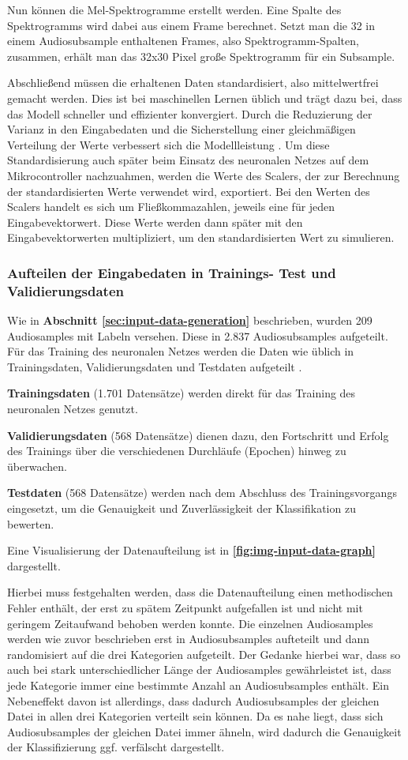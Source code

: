 Nun können die Mel-Spektrogramme erstellt werden. Eine Spalte des Spektrogramms wird dabei aus einem Frame berechnet. Setzt man die 32 in einem Audiosubsample enthaltenen Frames, also Spektrogramm-Spalten, zusammen, erhält man das 32x30 Pixel große Spektrogramm für ein Subsample.

Abschließend müssen die erhaltenen Daten standardisiert, also mittelwertfrei gemacht werden. Dies ist bei maschinellen Lernen üblich und trägt dazu bei, dass das Modell schneller und effizienter konvergiert. Durch die Reduzierung der Varianz in den Eingabedaten und die Sicherstellung einer gleichmäßigen Verteilung der Werte verbessert sich die Modellleistung \cite{ml-standardization-reason}. Um diese Standardisierung auch später beim Einsatz des neuronalen Netzes auf dem Mikrocontroller nachzuahmen, werden die Werte des Scalers, der zur Berechnung der standardisierten Werte verwendet wird, exportiert. Bei den Werten des Scalers handelt es sich um Fließkommazahlen, jeweils eine für jeden Eingabevektorwert. Diese Werte werden dann später mit den Eingabevektorwerten multipliziert, um den standardisierten Wert zu simulieren.


\subsubsection{Aufteilen der Eingabedaten in Trainings- Test und Validierungsdaten}
\label{sec:nn-data-split}
Wie in \textbf{Abschnitt \ref{sec:input-data-generation} }beschrieben, wurden 209 Audiosamples mit Labeln versehen. Diese  in 2.837 Audiosubsamples aufgeteilt. Für das Training des neuronalen Netzes werden die Daten wie üblich in Trainingsdaten, Validierungsdaten und Testdaten aufgeteilt \cite{ml-data-splitting-reason}.

\textbf{Trainingsdaten} (1.701 Datensätze) werden direkt für das Training des neuronalen Netzes genutzt.

\textbf{Validierungsdaten} (568 Datensätze) dienen dazu, den Fortschritt und Erfolg des Trainings über die verschiedenen Durchläufe (Epochen) hinweg zu überwachen.

\textbf{Testdaten} (568 Datensätze) werden nach dem Abschluss des Trainingsvorgangs eingesetzt, um die Genauigkeit und Zuverlässigkeit der Klassifikation zu bewerten.

Eine Visualisierung der Datenaufteilung ist in \textbf{\autoref{fig:img-input-data-graph}} dargestellt.

Hierbei muss festgehalten werden, dass die Datenaufteilung einen methodischen Fehler enthält, der erst zu spätem Zeitpunkt aufgefallen ist und nicht mit geringem Zeitaufwand behoben werden konnte. Die einzelnen Audiosamples werden wie zuvor beschrieben erst in Audiosubsamples aufteteilt und dann randomisiert auf die drei Kategorien aufgeteilt. Der Gedanke hierbei war, dass so auch bei stark unterschiedlicher Länge der Audiosamples gewährleistet ist, dass jede Kategorie immer eine bestimmte Anzahl an Audiosubsamples enthält. Ein Nebeneffekt davon ist allerdings, dass dadurch Audiosubsamples der gleichen Datei in allen drei Kategorien verteilt sein können. Da es nahe liegt, dass sich Audiosubsamples der gleichen Datei immer ähneln, wird dadurch die Genauigkeit der Klassifizierung ggf. verfälscht dargestellt.

